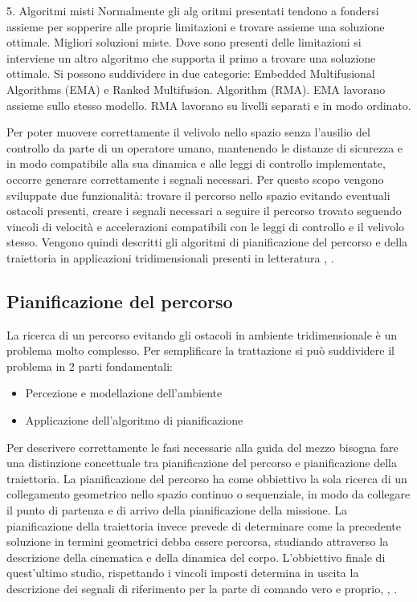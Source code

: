 \begin{idee}
	5. Algoritmi misti
		Normalmente gli alg
		oritmi presentati tendono a fondersi assieme per sopperire alle proprie limitazioni e trovare assieme una soluzione ottimale. Migliori soluzioni miste. Dove sono presenti delle limitazioni si interviene un altro algoritmo che supporta il primo a trovare una soluzione ottimale.	Si possono suddividere in due categorie: Embedded Multifusional Algorithms (EMA) e Ranked Multifusion. Algorithm (RMA).
		EMA lavorano assieme sullo stesso modello.
		RMA lavorano su livelli separati e in modo ordinato.	
	
\end{idee}

Per poter muovere correttamente il velivolo nello spazio senza l'ausilio del controllo da parte di un operatore umano, mantenendo le distanze di sicurezza e in modo compatibile alla sua dinamica e alle leggi di controllo implementate, occorre generare correttamente i segnali necessari. Per questo scopo vengono sviluppate due funzionalità: trovare il percorso nello spazio evitando eventuali ostacoli presenti, creare i segnali necessari a seguire il percorso trovato seguendo vincoli di velocità e accelerazioni compatibili con le leggi di controllo e il velivolo stesso. Vengono quindi descritti gli algoritmi di pianificazione del percorso e della traiettoria in applicazioni tridimensionali presenti in letteratura \cite{YangLiang2016SoR3}, \cite{PathPlannigOverview}.

\subsection{Pianificazione del percorso}

La ricerca di un percorso evitando gli ostacoli in ambiente tridimensionale è un problema molto complesso. Per semplificare la trattazione si può suddividere il problema in 2 parti fondamentali:
\begin{itemize}
	\item Percezione e modellazione dell'ambiente
	\item Applicazione dell'algoritmo di pianificazione
\end{itemize}

Per descrivere correttamente le fasi necessarie alla guida del mezzo bisogna fare una distinzione concettuale tra pianificazione del percorso e pianificazione della traiettoria. La pianificazione del percorso ha come obbiettivo la sola ricerca di un collegamento geometrico nello spazio continuo o sequenziale, in modo da collegare il punto di partenza e di arrivo della pianificazione della missione. La pianificazione della traiettoria invece prevede di determinare come la precedente soluzione in termini geometrici debba essere percorsa, studiando attraverso la descrizione della cinematica e della dinamica del corpo. L'obbiettivo finale di quest'ultimo studio, rispettando i vincoli imposti determina in uscita la descrizione dei segnali di riferimento per la parte di comando vero e proprio, \cite{YangLiang2016SoR3}, \cite{PathPlannigOverview}.

